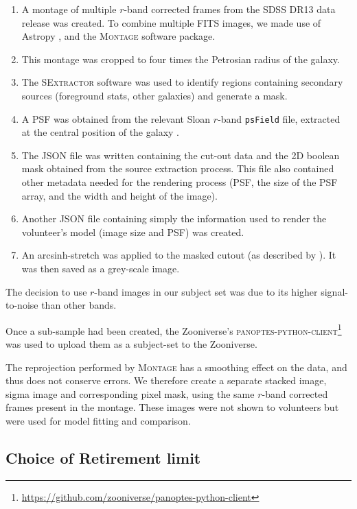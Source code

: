 \documentclass[main\.tex]{subfiles}
\begin{document}
\begin{enumerate}
\item A montage of multiple $r$-band corrected frames from the SDSS DR13 \citep{2017ApJS..233...25A} data release was created. To combine multiple FITS images, we made use of Astropy \citep{2018AJ....156..123A}, and the \textsc{Montage} \citep{2010arXiv1005.4454J} software package.
\item This montage was cropped to four times the Petrosian radius of the galaxy.
\item The \textsc{SExtractor} software \citep{source-extractor} was used to identify regions containing secondary sources (foreground stats, other galaxies) and generate a mask.
\item A PSF was obtained from the relevant Sloan $r$-band \texttt{psField} file, extracted at the central position of the galaxy \citep{2002AJ....123..485S}.
\item The JSON file was written containing the cut-out data and the 2D boolean mask obtained from the source extraction process. This file also contained other metadata needed for the rendering process (PSF, the size of the PSF array, and the width and height of the image).
\item Another JSON file containing simply the information used to render the volunteer's model (image size and PSF) was created.
\item An arcsinh-stretch was applied to the masked cutout (as described by \citealt{Lupton2003:astro-ph/0312483v1}). It was then saved as a grey-scale image.
\end{enumerate}

The decision to use $r$-band images in our subject set was due to its higher signal-to-noise than other bands.

Once a sub-sample had been created, the Zooniverse's \textsc{panoptes-python-client}\footnote{\url{https://github.com/zooniverse/panoptes-python-client}} was used to upload them as a subject-set to the Zooniverse.

The reprojection performed by \textsc{Montage} has a smoothing effect on the data, and thus does not conserve errors. We therefore create a separate stacked image, sigma image and corresponding pixel mask, using the same $r$-band corrected frames present in the montage. These images were not shown to volunteers but were used for model fitting and comparison.

\subsection{Choice of Retirement limit}
\label{sec:retirement-limit}
\end{document}
